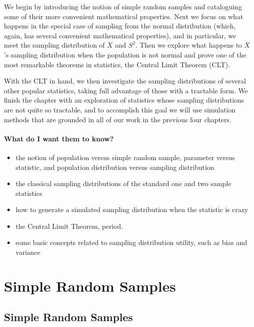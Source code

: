 \documentclass[captions=tableheading]{scrbook}
\begin{document}
We begin by introducing the notion of simple random samples and cataloguing some of their more convenient mathematical properties. Next we focus on what happens in the special case of sampling from the normal distribution (which, again, has several convenient mathematical properties), and in particular, we meet the sampling distribution of \(\overline{X}\) and \(S^{2}\). Then we explore what happens to \(\overline{X}\)'s sampling distribution when the population is not normal and prove one of the most remarkable theorems in statistics, the Central Limit Theorem (CLT).

With the CLT in hand, we then investigate the sampling distributions of several other popular statistics, taking full advantage of those with a tractable form. We finish the chapter with an exploration of statistics whose sampling distributions are not quite so tractable, and to accomplish this goal we will use simulation methods that are grounded in all of our work in the previous four chapters.

\paragraph*{What do I want them to know?}

\begin{itemize}
\item the notion of population versus simple random sample, parameter versus statistic, and population distribution versus sampling distribution
\item the classical sampling distributions of the standard one and two sample statistics
\item how to generate a simulated sampling distribution when the statistic is crazy
\item the Central Limit Theorem, period.
\item some basic concepts related to sampling distribution utility, such as bias and variance
\end{itemize}
\section{Simple Random Samples}
\label{sec-8-1}

\label{sec:simple-random-samples}
\subsection{Simple Random Samples}
\label{sec-8-1-1}
\end{document}
